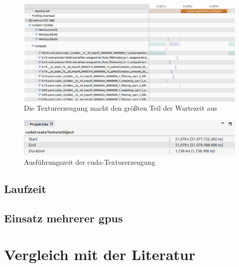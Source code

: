 \begin{figure}
    \includegraphics[width=\linewidth]{img/timeline_texture2}
    \caption{Die Texturerzeugung macht den größten Teil der Wartezeit aus}
    \label{fig:kernel_tex}
\end{figure}

\begin{figure}
    \includegraphics[width=\linewidth]{img/timeline_texture_properties}
    \caption{Ausführungszeit der \gls{cuda}-Texturerzeugung}
    \label{fig:kernel_tex_prop}
\end{figure}

\subsection{Laufzeit}

\subsection{Einsatz mehrerer \gls{gpu}s}

\section{Vergleich mit der Literatur}
